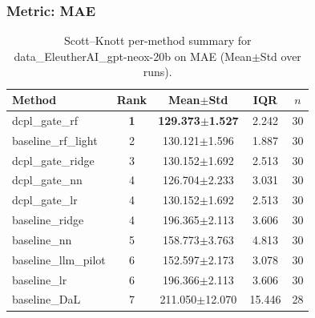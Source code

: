 \subsubsection*{Metric: MAE}
\begin{table}[H]
\centering
\scriptsize
\setlength{\tabcolsep}{4pt}
\renewcommand{\arraystretch}{1.1}
\caption{Scott--Knott per-method summary for data\_EleutherAI\_gpt-neox-20b on MAE (Mean$\pm$Std over runs).}
\label{tab:sk_data_EleutherAI_gpt-neox-20b_MAE}
\begin{tabular}{l|c|c|c|c}
\hline
\textbf{Method} & \textbf{Rank} & \textbf{Mean$\pm$Std} & \textbf{IQR} & \textbf{$n$} \\
\hline
\rowcolor{red!15} dcpl\_gate\_rf & \textbf{1} & \textbf{129.373$\pm$1.527} & 2.242 & 30 \\
baseline\_rf\_light & 2 & 130.121$\pm$1.596 & 1.887 & 30 \\
dcpl\_gate\_ridge & 3 & 130.152$\pm$1.692 & 2.513 & 30 \\
dcpl\_gate\_nn & 4 & 126.704$\pm$2.233 & 3.031 & 30 \\
dcpl\_gate\_lr & 4 & 130.152$\pm$1.692 & 2.513 & 30 \\
baseline\_ridge & 4 & 196.365$\pm$2.113 & 3.606 & 30 \\
baseline\_nn & 5 & 158.773$\pm$3.763 & 4.813 & 30 \\
baseline\_llm\_pilot & 6 & 152.597$\pm$2.173 & 3.078 & 30 \\
baseline\_lr & 6 & 196.366$\pm$2.113 & 3.606 & 30 \\
baseline\_DaL & 7 & 211.050$\pm$12.070 & 15.446 & 28 \\
\hline
\end{tabular}
\end{table}

